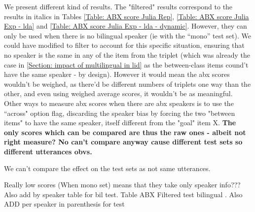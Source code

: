  \par \noindent We present different kind of results. The "filtered" results correspond to the results in italics in Tables \ref{Table: ABX score Julia Rep}, \ref{Table: ABX score Julia Exp - lda} and \ref{Table: ABX score Julia Exp - lda - dynamic}. However, they can only be used when there is no bilingual speaker (ie with the ``mono'' test set). We could have modified to filter to account for this specific situation, ensuring that no speaker is the same in any of the item from the triplet (which was already the case in \ref{Section: impact of multilingual in lid} as the between-class items cound't have the same speaker - by design). However it would mean the abx scores wouldn't be weighed, as there'd be different numbers of triplets one way than the other, and even using weighed average scores, it wouldn't be as meaningful. Other ways to measure abx scores when there are abx speakers is to use the ``across" option flag, discarding the speaker bias by forcing the two "between items" to have the same speaker, itself different from the "goal" item X. \textbf{The only scores which can be compared are thus the raw ones - albeit not right measure? No can't compare anyway cause different test sets so different utterances obvs. }%

We can't compare the effect on the test sets as not same utterances. 

\bigskip
\par Really low scores (When mono set) means that they take only speaker info???
Also add by speaker table for bil test. 
Table ABX Filtered test bilingual . Also ADD per speaker in parenthesis for test 




